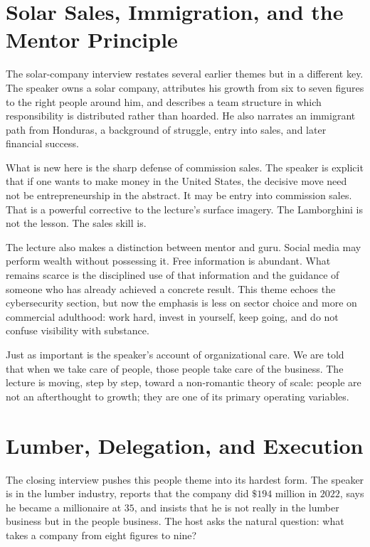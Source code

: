 \section{Solar Sales, Immigration, and the Mentor Principle}

The solar-company interview restates several earlier themes but in a different key. The speaker owns a solar company, attributes his growth from six to seven figures to the right people around him, and describes a team structure in which responsibility is distributed rather than hoarded. He also narrates an immigrant path from Honduras, a background of struggle, entry into sales, and later financial success.

What is new here is the sharp defense of commission sales. The speaker is explicit that if one wants to make money in the United States, the decisive move need not be entrepreneurship in the abstract. It may be entry into commission sales. That is a powerful corrective to the lecture's surface imagery. The Lamborghini is not the lesson. The sales skill is.

The lecture also makes a distinction between mentor and guru. Social media may perform wealth without possessing it. Free information is abundant. What remains scarce is the disciplined use of that information and the guidance of someone who has already achieved a concrete result. This theme echoes the cybersecurity section, but now the emphasis is less on sector choice and more on commercial adulthood: work hard, invest in yourself, keep going, and do not confuse visibility with substance.

Just as important is the speaker's account of organizational care. We are told that when we take care of people, those people take care of the business. The lecture is moving, step by step, toward a non-romantic theory of scale: people are not an afterthought to growth; they are one of its primary operating variables.

\section{Lumber, Delegation, and Execution}

The closing interview pushes this people theme into its hardest form. The speaker is in the lumber industry, reports that the company did \(\$194\) million in \(2022\), says he became a millionaire at \(35\), and insists that he is not really in the lumber business but in the people business. The host asks the natural question: what takes a company from eight figures to nine?

